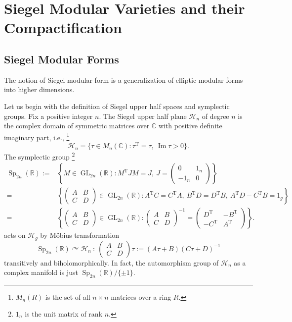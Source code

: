 \documentclass[11pt,english]{smfart}
\theoremstyle{definition}
\theoremstyle{remark}
\newcommand{\R}{\mathbb{R}}
\renewcommand{\C}{\mathbb{C}}
\DeclareMathOperator{\GL}{GL}
\DeclareMathOperator{\Sp}{Sp}
\newcommand{\tran}[1]{{#1}^{\mathrm{T}}} %
\renewcommand{\Im}{\mathop{\mathrm{Im}}}
\begin{document}
\section{Siegel Modular Varieties and their Compactification}
\subsection{Siegel Modular Forms}
The notion of Siegel modular form is a generalization of elliptic modular forms into higher dimensions.

Let us begin with the definition of Siegel upper half spaces and symplectic groups. Fix a positive integer $n$.
The Siegel upper half plane $\mathcal{H}_n$ of degree $n$ is the complex domain of symmetric matrices over $\C$ with positive definite imaginary part, i.e.,
\footnote{$M_n(R)$ is the set of all $n\times n$ matrices over a ring $R$.}
\[\mathcal{H}_n = \{\tau\in M_n(\C):\tran{\tau} = \tau,\ \Im\tau > 0\}.\]
The symplectic group
\footnote{$1_n$ is the unit matrix of rank $n$.} \begin{align*}
    \Sp_{2n}(\R{}) :=&{} \left\{M\in \GL_{2n}(\R{}):\tran{M}JM = J,\ J = \begin{pmatrix}
        0 & 1_n \\ -1_n & 0
    \end{pmatrix}\right\}\\
    =&{} \left\{\begin{pmatrix}
        A & B \\ C & D
    \end{pmatrix}\in \GL_{2n}(\R{}): \tran{A}C = \tran{C}A,\ \tran{B}D = \tran{D}B,\ \tran{A}D - \tran{C}B = 1_g\right\}\\
    =&{} \left\{\begin{pmatrix}
        A & B \\ C & D
    \end{pmatrix}\in \GL_{2n}(\R{}): \begin{pmatrix}
        A & B \\ C & D
    \end{pmatrix}^{-1} = \begin{pmatrix}
        \tran{D} & -\tran{B} \\ -\tran{C} & \tran{A}
    \end{pmatrix}\right\}.
\end{align*} acts on $\mathcal{H}_g$ by M\"obius transformation\[\Sp_{2n}(\R{})\curvearrowright \mathcal{H}_n\ :\
\begin{pmatrix}
    A & B \\ C & D
\end{pmatrix}\tau := (A\tau + B)(C\tau + D)^{-1}\] transitively and biholomorphically.
In fact, the automorphism group of $\mathcal{H}_n$ as a complex manifold is just $\Sp_{2n}(\R)/\{\pm 1\}$.
\end{document}
